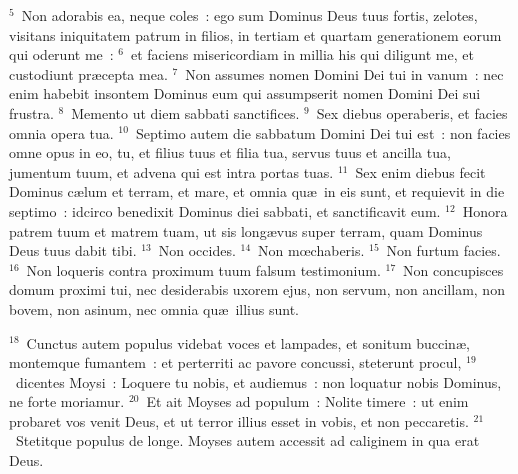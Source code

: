 ${}^{5}$~Non adorabis ea, neque coles~: ego sum Dominus Deus tuus fortis, zelotes, visitans iniquitatem patrum in filios, in tertiam et quartam generationem eorum qui oderunt me~:
${}^{6}$~et faciens misericordiam in millia his qui diligunt me, et custodiunt pr\ae cepta mea.
${}^{7}$~Non assumes nomen Domini Dei tui in vanum~: nec enim habebit insontem Dominus eum qui assumpserit nomen Domini Dei sui frustra.
${}^{8}$~Memento ut diem sabbati sanctifices.
${}^{9}$~Sex diebus operaberis, et facies omnia opera tua.
${}^{10}$~Septimo autem die sabbatum Domini Dei tui est~: non facies omne opus in eo, tu, et filius tuus et filia tua, servus tuus et ancilla tua, jumentum tuum, et advena qui est intra portas tuas.
${}^{11}$~Sex enim diebus fecit Dominus c\ae lum et terram, et mare, et omnia qu\ae\ in eis sunt, et requievit in die septimo~: idcirco benedixit Dominus diei sabbati, et sanctificavit eum.
${}^{12}$~Honora patrem tuum et matrem tuam, ut sis long\ae vus super terram, quam Dominus Deus tuus dabit tibi.
${}^{13}$~Non occides.
${}^{14}$~Non mœchaberis.
${}^{15}$~Non furtum facies.
${}^{16}$~Non loqueris contra proximum tuum falsum testimonium.
${}^{17}$~Non concupisces domum proximi tui, nec desiderabis uxorem ejus, non servum, non ancillam, non bovem, non asinum, nec omnia qu\ae\ illius sunt.


${}^{18}$~Cunctus autem populus videbat voces et lampades, et sonitum buccin\ae , montemque fumantem~: et perterriti ac pavore concussi, steterunt procul,
${}^{19}$~dicentes Moysi~: Loquere tu nobis, et audiemus~: non loquatur nobis Dominus, ne forte moriamur.
${}^{20}$~Et ait Moyses ad populum~: Nolite timere~: ut enim probaret vos venit Deus, et ut terror illius esset in vobis, et non peccaretis.
${}^{21}$~Stetitque populus de longe. Moyses autem accessit ad caliginem in qua erat Deus.


